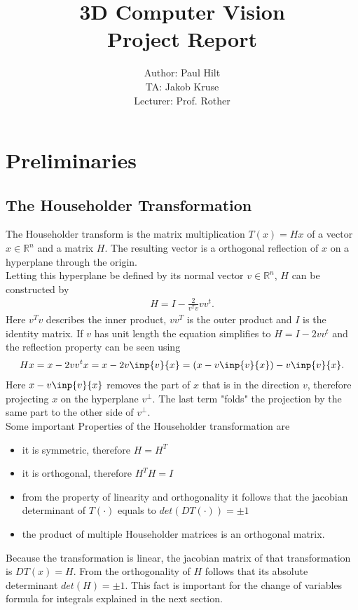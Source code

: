 \documentclass{article}
\begin{document}
\title{3D Computer Vision\\
	Project Report}
\author{Author: Paul Hilt \\
		TA: Jakob Kruse \\
		Lecturer: Prof. Rother}

\maketitle
\section{Preliminaries}
\subsection{The Householder Transformation}
The Householder transform is the matrix multiplication $T(x)=Hx$ of a vector $x \in \mathbb{R}^n$ and a matrix $H$. The resulting vector is a orthogonal reflection of $x$ on a hyperplane through the origin. \\
Letting this hyperplane be defined by its normal vector $v\in \mathbb{R}^n$, $H$ can be constructed by
\begin{align}
	H = I - \frac{2}{v^Tv}vv^t .
\end{align}
Here $v^Tv$ describes the inner product, $vv^T$ is the outer product and $I$ is the identity matrix. If $v$ has unit length the equation simplifies to $H = I - 2vv^t$ and the reflection property can be seen using
\begin{align}
Hx = x - 2vv^tx = x - 2v \inp{v}{x} = (x - v \inp{v}{x}) - v \inp{v}{x} .
\end{align}
Here $x - v \inp{v}{x}$ removes the part of $x$ that is in the direction $v$, therefore projecting $x$ on the hyperplane $v^{\perp}$. The last term "folds" the projection by the same part to the other side of $v^{\perp}$. \\
Some important Properties of the Householder transformation are\\
\begin{itemize}
	\item it is symmetric, therefore $H=H^T$
	\item it is orthogonal, therefore $H^TH=I$
	\item from the property of linearity and orthogonality it follows that the jacobian determinant of $T(\cdot)$ equals to $det(DT(\cdot)) = \pm 1$
	\item the product of multiple Householder matrices is an orthogonal matrix.
\end{itemize}
Because the transformation is linear, the jacobian matrix of that transformation is $DT(x) = H$. From the orthogonality of $H$ follows that its absolute determinant $det(H) = \pm 1$. This fact is important for the change of variables formula for integrals explained in the next section. 
\end{document}
